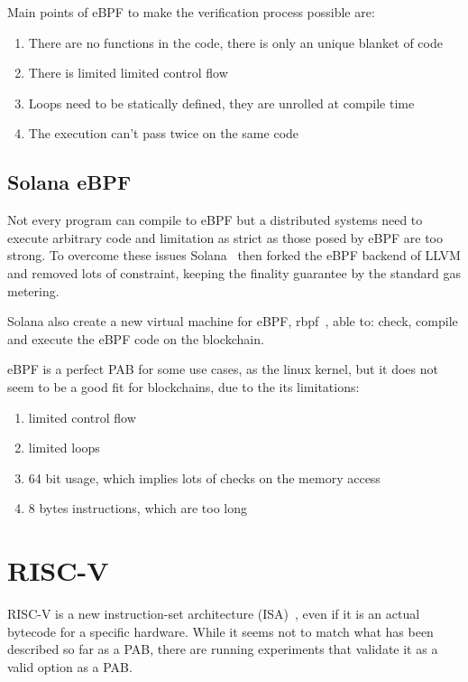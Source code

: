 Main points of eBPF to make the verification process possible are:
\begin{enumerate}
  \item There are no functions in the code, there is only an unique blanket of code
  \item There is limited limited control flow
  \item Loops need to be statically defined, they are unrolled at compile time
  \item The execution can't pass twice on the same code
\end{enumerate}

\subsection{Solana eBPF}

Not every program can compile to eBPF but a distributed systems need to execute arbitrary code and limitation as strict as those posed by eBPF are too strong. To overcome these issues Solana~\cite{yakovenko2018solana} then forked the eBPF backend of LLVM and removed lots of constraint, keeping the finality guarantee by the standard gas metering.~\cite{ebpf-contracts}

Solana also create a new virtual machine for eBPF, rbpf~\cite{rbpf}, able to: check, compile and execute the eBPF code on the blockchain.

eBPF is a perfect PAB for some use cases, as the linux kernel, but it does not seem to be a good fit for blockchains, due to the its limitations:
\begin{enumerate}
  \item limited control flow
  \item limited loops
  \item 64 bit usage, which implies lots of checks on the memory access
  \item 8 bytes instructions, which are too long
\end{enumerate}

\section{RISC-V}

RISC-V is a new instruction-set architecture (ISA)~\cite{risc-v-spec}, even if it is an actual bytecode for a specific hardware. While it seems not to match what has been described so far as a PAB, there are running experiments that validate it as a valid option as a PAB.

